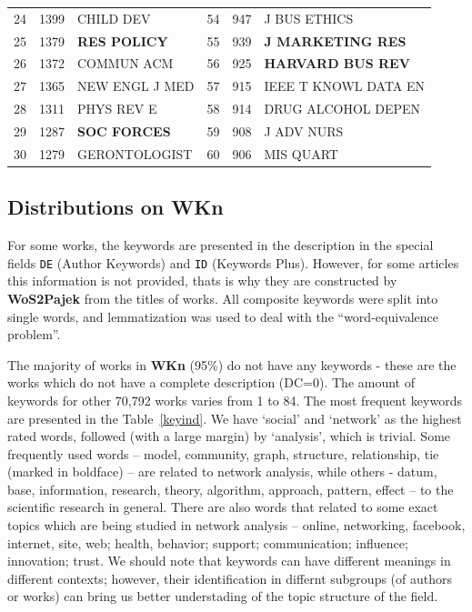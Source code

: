 \documentclass[11pt]{article} %
\newcommand{\Remark}[1]{\ifodd\value{page} \normalmarginpar
 \else \reversemarginpar \fi \marginpar{{\footnotesize #1}} }
\begin{document}
\begin{table}
\begin{tabular}{c|r|l||c|r|l}
24&	1399&	CHILD DEV&	54&	947&	J BUS ETHICS\\
25&	1379&	\textbf{RES POLICY}&	55&	939&	\textbf{J MARKETING RES}\\
26&	1372&	COMMUN ACM&	56&	925&	\textbf{HARVARD BUS REV}\\
27&	1365&	NEW ENGL J MED&	57&	915&	IEEE T KNOWL DATA EN\\
28&	1311&	PHYS REV E&	58&	914&	DRUG ALCOHOL DEPEN\\
29&	1287&	\textbf{SOC FORCES}&	59&	908&	J ADV NURS\\
30&	1279&	GERONTOLOGIST&	60&	906&	MIS QUART\\ \hline
\end{tabular}
\end{table}

\subsection{Distributions on WKn}

For some works, the keywords are presented in the description in the special fields \texttt {DE} (Author Keywords) and \texttt {ID} (Keywords Plus). However, for some articles this information is not provided, thats is why they are constructed by \textbf{WoS2Pajek} from the titles of works. All composite keywords were split into single words, and lemmatization was used to deal with the ``word-equivalence problem''. \medskip

The majority of works in \textbf{WKn} (95\%) do not have any keywords - these are the works which do not have a complete description (DC=0). The amount of keywords for other 70,792 works varies from 1 to 84. \Remark{ Idea: loolk at moda, or average?} The most frequent keywords are presented in the Table~\ref{keyind}. We have `social' and `network' as the highest rated words, followed (with a large margin) by `analysis', which is trivial. Some frequently used words -- model, community, graph, structure, relationship, tie (marked in boldface) -- are related to network analysis, while others - datum, base, information, research, theory, algorithm, approach, pattern, effect -- to the scientific research in general. There are also words that related to some exact topics which are being studied in network analysis -- online,  networking, facebook, internet, site, web; health, behavior; support; communication; influence; innovation; trust. We should note that keywords can have different meanings in different contexts; however, their identification in differnt subgroups (of authors or works) can bring us better understading of the topic structure of the field. \medskip
\end{document}
